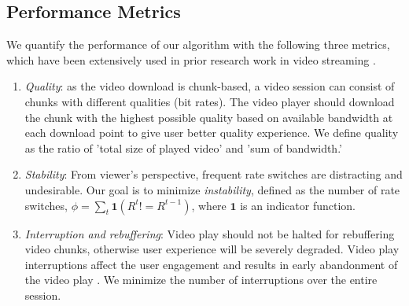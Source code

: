 
\subsection{Performance Metrics}\label{subsec:metrics}

We quantify the performance of our algorithm with the following three
metrics, which have been extensively used in prior research work in video
streaming 
\cite{Qava, Avis,VideoMeasurement, Festive}. 


\begin{enumerate}
\item\textit{Quality}: as the video download is chunk-based, a video
  session can consist of chunks with different qualities (bit
  rates). The video player should download the chunk with the highest
  possible quality based on available bandwidth at each download point
  to give user better quality experience. We define quality as the
  ratio of 'total size of played video' and 'sum of bandwidth.'

\item\textit{Stability}: From viewer's perspective, frequent rate
  switches are distracting and undesirable. Our goal is to minimize 
  \emph{instability}, defined as the number of rate switches, 
$\phi= \sum\limits_t
  \mathbf{1}(R^t!=R^{t-1})$, where $\mathbf{1}$ is an indicator
  function. 
  
\item\textit{Interruption and rebuffering}: Video play should not be
  halted for rebuffering video chunks, otherwise user experience will
  be severely degraded. Video play interruptions affect the user
  engagement and results in early abandonment of the video play
  . We minimize the 
  number of interruptions over the entire session. %
\end{enumerate}

